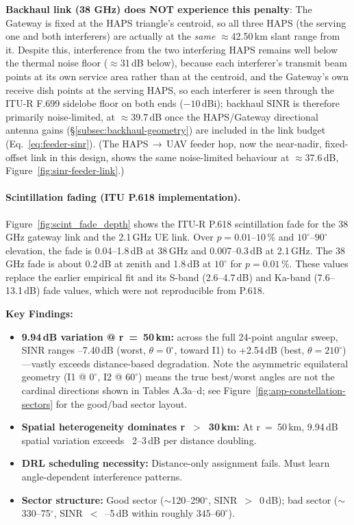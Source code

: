 \documentclass[conference]{IEEEtran}
\begin{document}
\noindent \textbf{Backhaul link (38 GHz) does NOT experience this penalty}: The Gateway is fixed at the HAPS triangle's centroid, so all three HAPS (the serving one and both interferers) are actually at the \emph{same} $\approx$42.50\,km slant range from it. Despite this, interference from the two interfering HAPS remains well below the thermal noise floor ($\approx$31\,dB below), because each interferer's transmit beam points at its own service area rather than at the centroid, and the Gateway's own receive dish points at the serving HAPS, so each interferer is seen through the ITU-R F.699 sidelobe floor on both ends ($-10$\,dBi); backhaul SINR is therefore primarily noise-limited, at $\approx$39.7\,dB once the HAPS/Gateway directional antenna gains (\S\ref{subsec:backhaul-geometry}) are included in the link budget (Eq.~\eqref{eq:feeder-sinr}). (The HAPS\,$\rightarrow$\,UAV feeder hop, now the near-nadir, fixed-offset link in this design, shows the same noise-limited behaviour at $\approx$37.6\,dB, Figure~\ref{fig:sinr-feeder-link}.)

\paragraph{Scintillation fading (ITU P.618 implementation).}
Figure~\ref{fig:scint_fade_depth} shows the ITU-R P.618 scintillation fade for the 38\,GHz gateway link and the 2.1\,GHz UE link. Over $p=0.01$--$10$\,\% and $10^\circ$--$90^\circ$ elevation, the fade is 0.04--1.8\,dB at 38\,GHz and 0.007--0.3\,dB at 2.1\,GHz. The 38\,GHz fade is about 0.2\,dB at zenith and 1.8\,dB at $10^\circ$ for $p=0.01$\,\%. These values replace the earlier empirical fit and its S-band (2.6--4.7\,dB) and Ka-band (7.6--13.1\,dB) fade values, which were not reproducible from P.618.

\noindent\textbf{Key Findings:}
\begin{itemize}
\item \textbf{9.94\,dB variation @ r~=~50\,km:} across the full 24-point angular sweep, SINR ranges --7.40\,dB (worst, $\theta=0^\circ$, toward I1) to +2.54\,dB (best, $\theta=210^\circ$)—vastly exceeds distance-based degradation. Note the asymmetric equilateral geometry (I1 @ $0^\circ$, I2 @ $60^\circ$) means the true best/worst angles are not the cardinal directions shown in Tables A.3a--d; see Figure~\ref{fig:app-constellation-sectors} for the good/bad sector layout.
\item \textbf{Spatial heterogeneity dominates r~$>$~30\,km:} At r~=~50\,km, 9.94\,dB spatial variation exceeds ~2--3\,dB per distance doubling.
\item \textbf{DRL scheduling necessity:} Distance-only assignment fails. Must learn angle-dependent interference patterns.
\item \textbf{Sector structure:} Good sector ($\sim$120--290$^\circ$, SINR~$>$~0\,dB); bad sector ($\sim$330--75$^\circ$, SINR~$<$~--5\,dB within roughly $345$--$60^\circ$).
\end{itemize}
\end{document}
